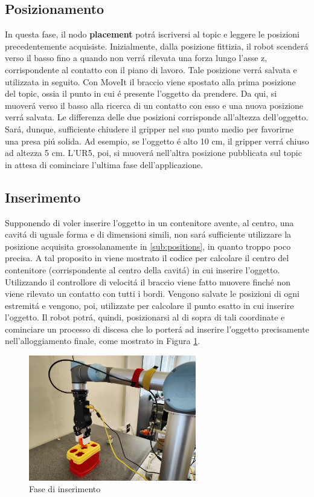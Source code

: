 \subsection{Posizionamento} \label{sub:placement}
In questa fase, il nodo \textbf{placement} \cite{placement} potr\'{a} iscriversi al topic e leggere le posizioni precedentemente 
acquisiste. Inizialmente, dalla posizione fittizia, il robot scender\'{a} verso il basso fino a quando non verr\'{a} rilevata 
una forza lungo l'asse z, corrispondente al contatto con il piano di lavoro. Tale posizione verr\'{a} salvata e utilizzata in seguito. 
Con MoveIt il braccio viene spostato alla prima posizione del topic, ossia il punto in cui \'{e} presente l'oggetto da prendere.
Da qui, si muover\'{a} verso il basso alla ricerca di un contatto con esso e una nuova posizione verr\'{a} salvata. 
Le differenza delle due posizioni corrisponde all'altezza dell'oggetto. Sar\'{a}, dunque, sufficiente chiudere il gripper 
nel suo punto medio per favorirne una presa pi\'{u} solida. Ad esempio, se l'oggetto \'{e} alto 10 cm, il gripper verr\'{a} chiuso 
ad altezza 5 cm. 
L'UR5, poi, si muover\'{a} nell'altra posizione pubblicata sul topic in attesa di cominciare l'ultima fase dell'applicazione.
\subsection{Inserimento} \label{sub:insertion}
Supponendo di voler inserire l'oggetto in un contenitore avente, al centro, una cavit\'{a} di uguale forma e di dimensioni simili, 
non sar\'{a} sufficiente utilizzare la posizione acquisita grossolanamente in \ref{sub:positions}, in quanto troppo poco precisa. 
A tal proposito in \cite{insertion} viene mostrato il codice per calcolare il centro del contenitore (corrispondente al 
centro della cavit\'{a}) in cui inserire l'oggetto. Utilizzando il controllore di velocit\'{a} il braccio viene fatto muovere 
finch\'{e} non viene rilevato un contatto con tutti i bordi. Vengono salvate le posizioni di ogni estremit\'{a} e vengono, poi, 
utilizzate per calcolare il punto esatto in cui inserire l'oggetto. Il robot potr\'{a}, quindi, posizionarsi al di sopra di 
tali coordinate e cominciare un processo di discesa che lo porter\'{a} ad inserire l'oggetto precisamente nell'alloggiamento finale, 
come mostrato in Figura \ref{fig:insertion}. 
\newpage
\begin{figure}[H]
    \centering
    \includegraphics*[width=0.65\textwidth]{images/insertion.jpg}
    \caption{Fase di inserimento}
    \label{fig:insertion}
\end{figure}
